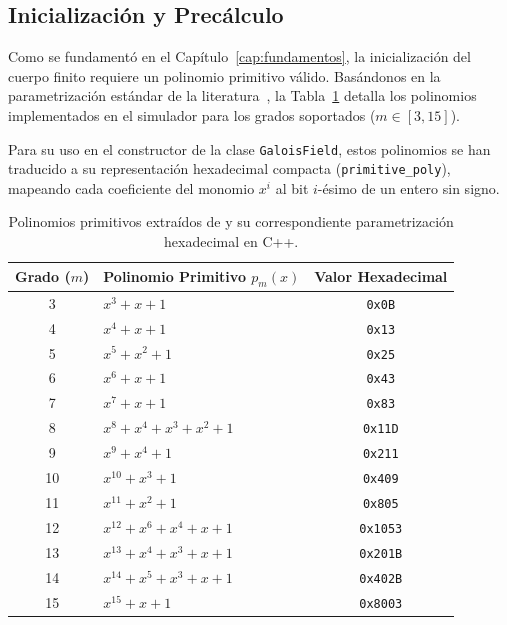 \subsection{Inicialización y Precálculo}

Como se fundamentó en el Capítulo~\ref{cap:fundamentos}, la inicialización del cuerpo finito requiere un polinomio primitivo válido. Basándonos en la parametrización estándar de la literatura~\cite{artes2012comunicaciones}, la Tabla~\ref{tab:polinomios_primitivos} detalla los polinomios implementados en el simulador para los grados soportados ($m \in [3, 15]$). 

Para su uso en el constructor de la clase \texttt{GaloisField}, estos polinomios se han traducido a su representación hexadecimal compacta (\texttt{primitive\_poly}), mapeando cada coeficiente del monomio $x^i$ al bit $i$-ésimo de un entero sin signo.

\begin{table}[h!]
\centering
\caption{Polinomios primitivos extraídos de \cite{artes2012comunicaciones} y su correspondiente parametrización hexadecimal en C++.}
\label{tab:polinomios_primitivos}
\begin{tabular}{clc}
\hline
\textbf{Grado ($m$)} & \textbf{Polinomio Primitivo $p_m(x)$} & \textbf{Valor Hexadecimal} \\ \hline
3 & $x^3 + x + 1$ & \texttt{0x0B} \\
4 & $x^4 + x + 1$ & \texttt{0x13} \\
5 & $x^5 + x^2 + 1$ & \texttt{0x25} \\
6 & $x^6 + x + 1$ & \texttt{0x43} \\
7 & $x^7 + x + 1$ & \texttt{0x83} \\
8 & $x^8 + x^4 + x^3 + x^2 + 1$ & \texttt{0x11D} \\
9 & $x^9 + x^4 + 1$ & \texttt{0x211} \\
10 & $x^{10} + x^3 + 1$ & \texttt{0x409} \\
11 & $x^{11} + x^2 + 1$ & \texttt{0x805} \\
12 & $x^{12} + x^6 + x^4 + x + 1$ & \texttt{0x1053} \\
13 & $x^{13} + x^4 + x^3 + x + 1$ & \texttt{0x201B} \\
14 & $x^{14} + x^5 + x^3 + x + 1$ & \texttt{0x402B} \\
15 & $x^{15} + x + 1$ & \texttt{0x8003} \\ \hline
\end{tabular}
\end{table}


